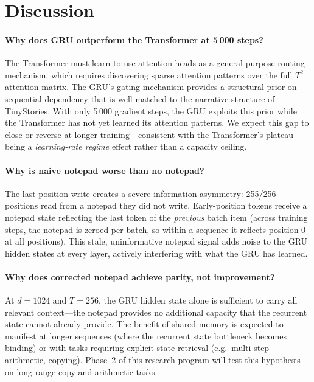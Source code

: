 \documentclass[11pt,a4paper]{article}
\begin{document}
\section{Discussion}
\label{sec:discussion}

\paragraph{Why does GRU outperform the Transformer at 5\,000 steps?}
The Transformer must learn to use attention heads as a general-purpose
routing mechanism, which requires discovering sparse attention patterns over
the full $T^2$ attention matrix.  The GRU's gating mechanism provides a
structural prior on sequential dependency that is well-matched to the
narrative structure of TinyStories.  With only 5\,000 gradient steps, the
GRU exploits this prior while the Transformer has not yet learned its
attention patterns.  We expect this gap to close or reverse at longer
training---consistent with the Transformer's plateau being a
\emph{learning-rate regime} effect rather than a capacity ceiling.

\paragraph{Why is naive notepad worse than no notepad?}
The last-position write creates a severe information asymmetry: 255/256
positions read from a notepad they did not write.  Early-position tokens
receive a notepad state reflecting the last token of the \emph{previous}
batch item (across training steps, the notepad is zeroed per batch, so
within a sequence it reflects position 0 at all positions).  This stale,
uninformative notepad signal adds noise to the GRU hidden states at every
layer, actively interfering with what the GRU has learned.

\paragraph{Why does corrected notepad achieve parity, not improvement?}
At $d{=}1024$ and $T{=}256$, the GRU hidden state alone is sufficient to
carry all relevant context---the notepad provides no additional capacity that
the recurrent state cannot already provide.  The benefit of shared memory is
expected to manifest at longer sequences (where the recurrent state
bottleneck becomes binding) or with tasks requiring explicit state retrieval
(e.g.\ multi-step arithmetic, copying).  Phase~2 of this research program
will test this hypothesis on long-range copy and arithmetic tasks.
\end{document}
